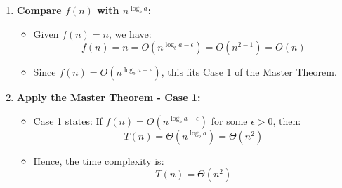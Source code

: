 \begin{example}
\begin{enumerate}
            \item \textbf{Compare \( f(n) \) with \( n^{\log_b a} \):}
            \begin{itemize}
                \item Given \( f(n) = n \), we have:
                \[
                f(n) = n = O\left(n^{\log_b a - \epsilon}\right) = O\left(n^{2-1}\right) = O(n)
                \]
                \item Since \( f(n) = O\left(n^{\log_b a - \epsilon}\right) \), this fits Case 1 of the Master Theorem.
            \end{itemize}
            
            \item \textbf{Apply the Master Theorem - Case 1:}
            \begin{itemize}
                \item Case 1 states: If \( f(n) = O\left(n^{\log_b a - \epsilon}\right) \) for some \( \epsilon > 0 \), then:
                \[
                T(n) = \Theta\left(n^{\log_b a}\right) = \Theta(n^2)
                \]
                \item Hence, the time complexity is:
                \[
                T(n) = \Theta(n^2)
                \]
            \end{itemize}
        \end{enumerate}
    \end{example}


